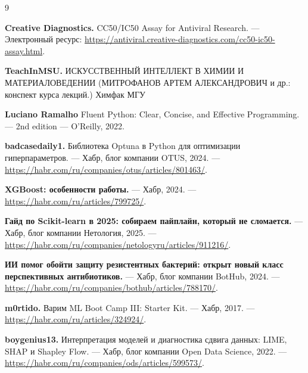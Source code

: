 \documentclass[12pt,a4paper]{report}
\begin{document}
\begin{thebibliography}{9}


\textbf{Creative Diagnostics.}
CC50/IC50 Assay for Antiviral Research. ---
Электронный ресурс:
\url{https://antiviral.creative-diagnostics.com/cc50-ic50-assay.html}.


\textbf{TeachInMSU.}
ИСКУССТВЕННЫЙ ИНТЕЛЛЕКТ В ХИМИИ И МАТЕРИАЛОВЕДЕНИИ (МИТРОФАНОВ АРТЕМ АЛЕКСАНДРОВИЧ и др.: конспект курса лекций.)
Химфак МГУ

\textbf{Luciano Ramalho}
Fluent Python: Clear, Concise, and Effective Programming. ---
2nd edition --- O'Reilly, 2022.

\textbf{badcasedaily1.}
Библиотека Optuna в Python для оптимизации гиперпараметров. ---
Хабр, блог компании OTUS, 2024. ---
\url{https://habr.com/ru/companies/otus/articles/801463/}.

\textbf{XGBoost: особенности работы.} ---
Хабр, 2024. ---
\url{https://habr.com/ru/articles/799725/}.

\textbf{Гайд по Scikit-learn в 2025: собираем пайплайн, который не сломается.} ---
Хабр, блог компании Нетология, 2025. ---
\url{https://habr.com/ru/companies/netologyru/articles/911216/}.

\textbf{ИИ помог обойти защиту резистентных бактерий: открыт новый класс перспективных антибиотиков.} ---
Хабр, блог компании BotHub, 2024. ---
\url{https://habr.com/ru/companies/bothub/articles/788170/}.

\textbf{m0rtido.}
Варим ML Boot Camp III: Starter Kit. ---
Хабр, 2017. ---
\url{https://habr.com/ru/articles/324924/}.

\textbf{boygenius13.}
Интерпретация моделей и диагностика сдвига данных: LIME, SHAP и Shapley Flow. ---
Хабр, блог компании Open Data Science, 2022. ---
\url{https://habr.com/ru/companies/ods/articles/599573/}.

\end{thebibliography}
\end{document}
